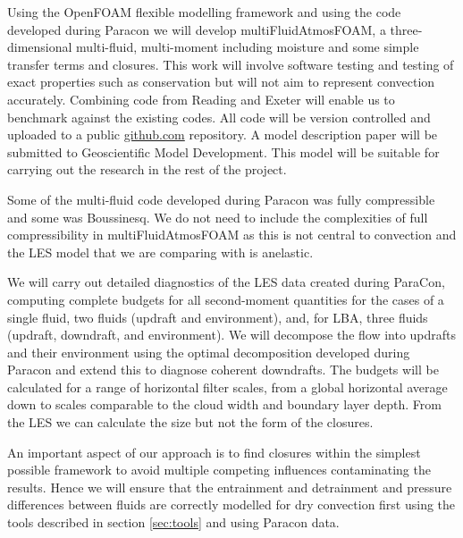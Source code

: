 \documentclass[11pt,a4paper]{article}
\begin{document}

Using the OpenFOAM flexible modelling framework and using the code developed during Paracon we will develop multiFluidAtmosFOAM, a three-dimensional multi-fluid, multi-moment including moisture and some simple transfer terms and closures. This work will involve software testing and testing of exact properties such as conservation but will not aim to represent convection accurately. Combining code from Reading and Exeter will enable us to benchmark against the existing codes. All code will be version controlled and uploaded to a public \url{github.com} repository. A model description paper will be submitted to Geoscientific Model Development. This model will be suitable for carrying out the research in the rest of the project. 

Some of the multi-fluid code developed during Paracon was fully compressible and some was Boussinesq. We do not need to include the complexities of full compressibility in multiFluidAtmosFOAM as this is not central to convection and the LES model that we are comparing with is anelastic. 


We will carry out detailed diagnostics of the LES data created during ParaCon, computing complete budgets for all second-moment quantities for the cases of a single fluid, two fluids (updraft and environment), and, for LBA, three fluids (updraft, downdraft, and environment).
We will decompose the flow into updrafts and their environment using the optimal decomposition developed during Paracon and extend this to diagnose coherent downdrafts. The budgets will be calculated for a range of horizontal filter scales, from a global horizontal average down to scales comparable to the cloud width and boundary layer depth. From the LES we can calculate the size but not the form of the closures.


An important aspect of our approach is to find closures within the simplest possible framework to avoid multiple competing influences contaminating the results. Hence we will ensure that the entrainment and detrainment and pressure differences between fluids are correctly modelled for dry convection first using the tools described in section \ref{sec:tools} and using Paracon data.
\end{document}
